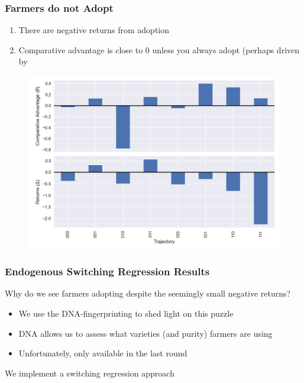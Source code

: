 \documentclass{beamer}
\begin{document}
\begin{frame}
\frametitle{Farmers do not Adopt}
\begin{enumerate}
    \item There are negative returns from adoption
    \item Comparative advantage is close to 0 unless you always adopt (perhaps driven by 
\end{enumerate}

\begin{figure}
    \centering
    \includegraphics[scale=0.5]{results/figures/theta.png}\label{fig:theta_delta_raw}
\end{figure}
 
\end{frame}


\begin{frame}
\frametitle{Endogenous Switching Regression Results}

Why do we see farmers adopting despite the seemingly small negative returns?

\begin{itemize}
    \item We use the DNA-fingerprinting to shed light on this puzzle
    \item DNA allows us to assess what varieties (and purity) farmers are using 
    \item Unfortunately, only available in the last round
\end{itemize}

We implement a switching regression approach

\end{frame}
\end{document}
